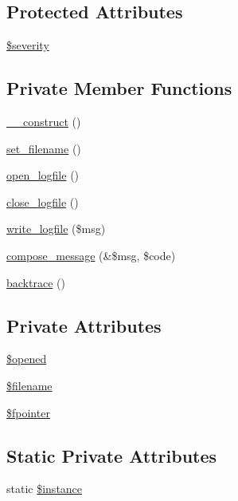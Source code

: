 \subsection*{Protected Attributes}
\begin{DoxyCompactItemize}
\item 
\hyperlink{class__OWL_ad26b40a9dbbacb33e299b17826f8327c}{\$severity}
\end{DoxyCompactItemize}
\subsection*{Private Member Functions}
\begin{DoxyCompactItemize}
\item 
\hyperlink{classLogHandler_aacca49c4394109f4ccc494048a0b2cab}{\_\-\_\-construct} ()
\item 
\hyperlink{classLogHandler_a65ef4f1c6ab4cff4057f5f5932cc690e}{set\_\-filename} ()
\item 
\hyperlink{classLogHandler_aaf324e5156bf8ea83e5b4e990ea99e2d}{open\_\-logfile} ()
\item 
\hyperlink{classLogHandler_a1a3b03d9bb97404a4f746bd2aacc5a8c}{close\_\-logfile} ()
\item 
\hyperlink{classLogHandler_ae0cd68fb6f068e47f899a1e4c7f29ba9}{write\_\-logfile} (\$msg)
\item 
\hyperlink{classLogHandler_ad32511521115b21779d699c836197dd0}{compose\_\-message} (\&\$msg, \$code)
\item 
\hyperlink{classLogHandler_a441d505d1dfb81bd86dc1d3c53600552}{backtrace} ()
\end{DoxyCompactItemize}
\subsection*{Private Attributes}
\begin{DoxyCompactItemize}
\item 
\hyperlink{classLogHandler_a956e7e71a9ff96c6301d1f41a5bf207e}{\$opened}
\item 
\hyperlink{classLogHandler_ab51c12bcd654093b9d0153ab38ebad8c}{\$filename}
\item 
\hyperlink{classLogHandler_ad65c8954bda40d8a33828f0a0a2cbf5b}{\$fpointer}
\end{DoxyCompactItemize}
\subsection*{Static Private Attributes}
\begin{DoxyCompactItemize}
\item 
static \hyperlink{classLogHandler_a1907cf33534c0b1100fa593c12bcfb6e}{\$instance}
\end{DoxyCompactItemize}


